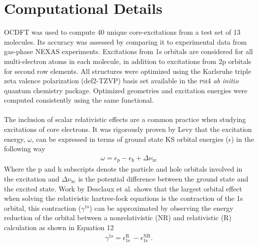 \documentclass[11.5pt]{article}
\begin{document}
\section{Computational Details}
OCDFT was used to compute 40 unique core-excitations from a test set of 13 molecules. Its accuracy was assessed by comparing it to experimental data from gas-phase NEXAS experiments.\cite{puttner_vibrationally_1999,remmers_high-resolution_1992,chen_k-shell_1989,tronc_nitrogen_1980,tronc_carbon_1979,francis_studies_1994,adachi_vibronic_1999,hitchcock_k-shell_1979,domke_carbon_1990,nayandin_angle-resolved_2001,bodeur_single-and_1990} Excitations from 1s orbitals are considered for all multi-electron atoms in each molecule, in addition to excitations from 2p orbitals for second row elements. All structures were optimized using the Karlsruhe triple zeta valence polarization (def2-TZVP) basis set\cite{weigend_balanced_2005,weigend_accurate_2006} available in the \textsc{psi4} \textit{ab initio} quantum chemistry package.\cite{turney_psi4:_2012} Optimized geometries and excitation energies were computed consistently using the same functional.
\\ \\
The inclusion of scalar relativistic effects are a common practice when studying excitations of core electrons.\cite{maganas_l-edge_2014,debeer_george_calibration_2010,bauer_herfd-xas_2014,ankudinov_sensitivity_2002} It was rigorously proven by Levy \cite{levy_excitation_1995} that the excitation energy, $\omega$, can be expressed in terms of ground state KS orbital energies ($\epsilon$) in the following way
\begin{align}
\omega = \epsilon_{\text{p}} - \epsilon_{\text{h}} + \Delta \nu_{\text{xc}} 
\end{align}
Where the p and h subscripts denote the particle and hole orbitals involved in the excitation and $\Delta \nu_{\text{xc}} $ is the potential difference between the ground state and the excited state. Work by Desclaux et al. \cite{desclaux_relativistic_1971} shows that the largest orbital effect when solving the relativistic hartree-fock equations is the contraction of the 1s orbital, this contraction ($\gamma^{\text{1s}}$) can be approximated by observing the energy reduction of the orbital between a nonrelativistic (NR) and relativistic (R) calculation as shown in Equation 12
\begin{align}
\gamma^{\text{1s}} = \epsilon_{\text{1s}}^{\text{R}} \  - \epsilon_{\text{1s}}^{\text{NR}}.
\end{align}
\end{document}
